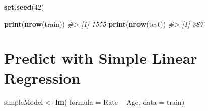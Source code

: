 \documentclass[]{book}
\newenvironment{Shaded}{\begin{snugshade}}{\end{snugshade}}
\newcommand{\CommentTok}[1]{\textcolor[rgb]{0.56,0.35,0.01}{\textit{#1}}}
\newcommand{\DataTypeTok}[1]{\textcolor[rgb]{0.13,0.29,0.53}{#1}}
\newcommand{\DecValTok}[1]{\textcolor[rgb]{0.00,0.00,0.81}{#1}}
\newcommand{\FloatTok}[1]{\textcolor[rgb]{0.00,0.00,0.81}{#1}}
\newcommand{\KeywordTok}[1]{\textcolor[rgb]{0.13,0.29,0.53}{\textbf{#1}}}
\newcommand{\NormalTok}[1]{#1}
\newcommand{\OperatorTok}[1]{\textcolor[rgb]{0.81,0.36,0.00}{\textbf{#1}}}
\newcommand{\OtherTok}[1]{\textcolor[rgb]{0.56,0.35,0.01}{#1}}
\newcommand{\StringTok}[1]{\textcolor[rgb]{0.31,0.60,0.02}{#1}}
\begin{document}
\begin{Shaded}
\begin{Highlighting}[]
\KeywordTok{set.seed}\NormalTok{(}\DecValTok{42}\NormalTok{)}
\end{Highlighting}
\end{Shaded}

\begin{Shaded}
\end{Shaded}

\begin{Shaded}
\begin{Highlighting}[]
\KeywordTok{print}\NormalTok{(}\KeywordTok{nrow}\NormalTok{(train))}
\CommentTok{#> [1] 1555}
\KeywordTok{print}\NormalTok{(}\KeywordTok{nrow}\NormalTok{(test))}
\CommentTok{#> [1] 387}
\end{Highlighting}
\end{Shaded}

\hypertarget{predict-with-simple-linear-regression}{%
\section{Predict with Simple Linear Regression}\label{predict-with-simple-linear-regression}}

\begin{Shaded}
\begin{Highlighting}[]
\NormalTok{simpleModel <-}\StringTok{ }\KeywordTok{lm}\NormalTok{(}
  \DataTypeTok{formula =}\NormalTok{ Rate }\OperatorTok{~}\StringTok{ }\NormalTok{Age,}
  \DataTypeTok{data =}\NormalTok{ train)}
\end{Highlighting}
\end{Shaded}
\end{document}
